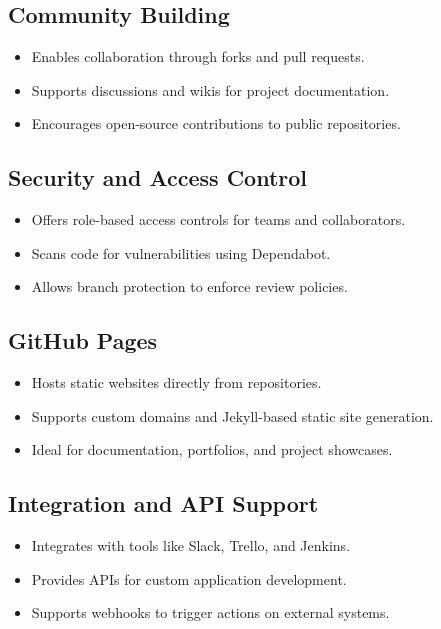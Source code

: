 \documentclass[openany]{book} %
\begin{document}
\subsection{Community Building}
\begin{itemize}
    \item Enables collaboration through forks and pull requests.
    \item Supports discussions and wikis for project documentation.
    \item Encourages open-source contributions to public repositories.
\end{itemize}

\subsection{Security and Access Control}
\begin{itemize}
    \item Offers role-based access controls for teams and collaborators.
    \item Scans code for vulnerabilities using Dependabot.
    \item Allows branch protection to enforce review policies.
\end{itemize}

\subsection{GitHub Pages}
\begin{itemize}
    \item Hosts static websites directly from repositories.
    \item Supports custom domains and Jekyll-based static site generation.
    \item Ideal for documentation, portfolios, and project showcases.
\end{itemize}

\subsection{Integration and API Support}
\begin{itemize}
    \item Integrates with tools like Slack, Trello, and Jenkins.
    \item Provides APIs for custom application development.
    \item Supports webhooks to trigger actions on external systems.
\end{itemize}
\end{document}
